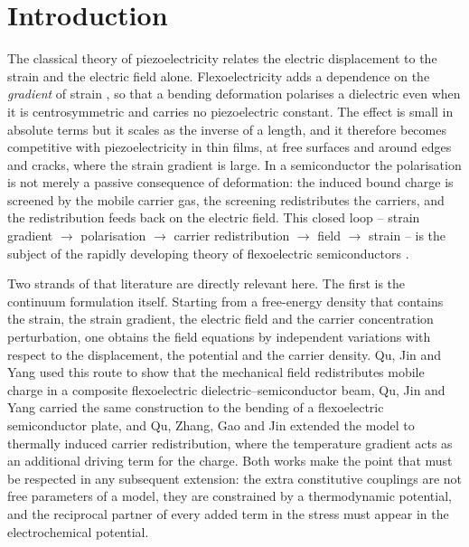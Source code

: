 \section{Introduction}
\label{sec:intro}

The classical theory of piezoelectricity relates the electric displacement to
the strain and the electric field alone.  Flexoelectricity adds a dependence on
the \emph{gradient} of strain \cite{shen2010theory,deng2020impact}, so that a
bending deformation polarises a dielectric even when it is centrosymmetric and
carries no piezoelectric constant.  The effect is small in absolute terms but
it scales as the inverse of a length, and it therefore becomes competitive with
piezoelectricity in thin films, at free surfaces and around edges and cracks,
where the strain gradient is large.  In a semiconductor the polarisation is not
merely a passive consequence of deformation: the induced bound charge is
screened by the mobile carrier gas, the screening redistributes the carriers,
and the redistribution feeds back on the electric field.  This closed loop --
strain gradient $\rightarrow$ polarisation $\rightarrow$ carrier redistribution
$\rightarrow$ field $\rightarrow$ strain -- is the subject of the rapidly
developing theory of flexoelectric semiconductors
\cite{qu2020mobile,qu2022thermal}.

Two strands of that literature are directly relevant here.  The first is the
continuum formulation itself.  Starting from a free-energy density that contains
the strain, the strain gradient, the electric field and the carrier
concentration perturbation, one obtains the field equations by independent
variations with respect to the displacement, the potential and the carrier
density.  Qu, Jin and Yang \cite{qu2020mobile} used this route to show that the
mechanical field redistributes mobile charge in a composite flexoelectric
dielectric--semiconductor beam, Qu, Jin and Yang \cite{qu2022bending} carried the same construction to the
bending of a flexoelectric semiconductor plate, and Qu, Zhang, Gao and Jin
\cite{qu2022thermal} extended the model to thermally induced carrier
redistribution, where the temperature gradient acts as an additional driving
term for the charge.  Both works make the point that must be respected in any
subsequent extension: the extra constitutive couplings are not free parameters
of a model, they are constrained by a thermodynamic potential, and the
reciprocal partner of every added term in the stress must appear in the
electrochemical potential.

